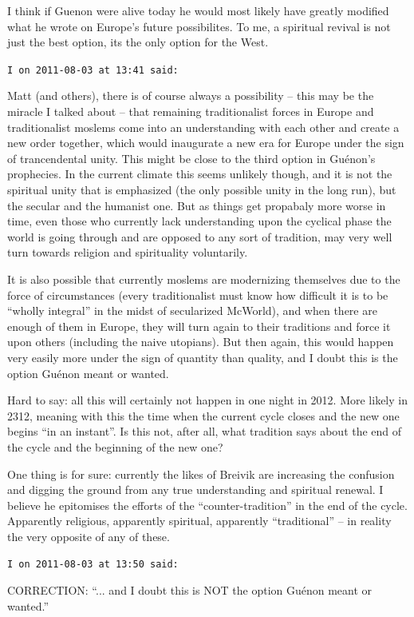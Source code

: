 \begin{footnotesize}
\begin{sffamily}
I think if Guenon were alive today he would most likely have greatly modified what he wrote on Europe's future possibilites. To me, a spiritual revival is not just the best option, its the only option for the West.

\hfill

\texttt{I on 2011-08-03 at 13:41 said:}

Matt (and others), there is of course always a possibility -- this may be the miracle I talked about -- that remaining traditionalist forces in Europe and traditionalist moslems come into an understanding with each other and create a new order together, which would inaugurate a new era for Europe under the sign of trancendental unity. This might be close to the third option in Guénon's prophecies. In the current climate this seems unlikely though, and it is not the spiritual unity that is emphasized (the only possible unity in the long run), but the secular and the humanist one. But as things get propabaly more worse in time, even those who currently lack understanding upon the cyclical phase the world is going through and are opposed to any sort of tradition, may very well turn towards religion and spirituality voluntarily.

It is also possible that currently moslems are modernizing themselves due to the force of circumstances (every traditionalist must know how difficult it is to be ``wholly integral'' in the midst of secularized McWorld), and when there are enough of them in Europe, they will turn again to their traditions and force it upon others (including the naive utopians). But then again, this would happen very easily more under the sign of quantity than quality, and I doubt this is the option Guénon meant or wanted.

Hard to say: all this will certainly not happen in one night in 2012. More likely in 2312, meaning with this the time when the current cycle closes and the new one begins ``in an instant''. Is this not, after all, what tradition says about the end of the cycle and the beginning of the new one?

One thing is for sure: currently the likes of Breivik are increasing the confusion and digging the ground from any true understanding and spiritual renewal. I believe he epitomises the efforts of the ``counter-tradition'' in the end of the cycle. Apparently religious, apparently spiritual, apparently ``traditional'' -- in reality the very opposite of any of these.

\hfill

\texttt{I on 2011-08-03 at 13:50 said:}

CORRECTION: ``... and I doubt this is NOT the option Guénon meant or wanted.''


\hfill

\end{sffamily}
\end{footnotesize}

